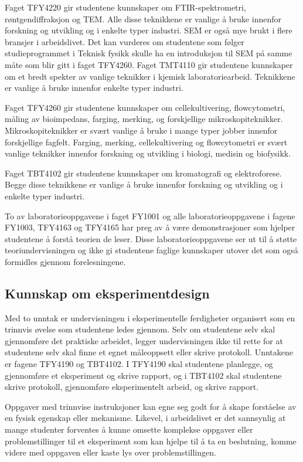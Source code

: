 \documentclass{article}
\begin{document}
Faget TFY4220 gir studentene kunnskaper om FTIR-spektrometri, røntgendiffraksjon og TEM. Alle disse teknikkene er vanlige å bruke innenfor forskning og utvikling og i enkelte typer industri. SEM er også mye brukt i flere bransjer i arbeidslivet. Det kan vurderes om studentene som følger studieprogrammet i Teknisk fysikk skulle ha en introduksjon til SEM på samme måte som blir gitt i faget TFY4260.
Faget TMT4110 gir studentene kunnskaper om et bredt spekter av vanlige teknikker i kjemisk laboratoriearbeid. Teknikkene er vanlige å bruke innenfor enkelte typer industri.

Faget TFY4260 gir studentene kunnskaper om cellekultivering, flowcytometri, måling av bioimpedans, farging, merking, og forskjellige mikroskopiteknikker. Mikroskopiteknikker er svært vanlige å bruke i mange typer jobber innenfor forskjellige fagfelt. Farging, merking, cellekultivering og flowcytometri er svært vanlige teknikker innenfor forskning og utvikling i biologi, medisin og biofysikk.

Faget TBT4102 gir studentene kunnskaper om kromatografi og elektroforese. Begge disse teknikkene er vanlige å bruke innenfor forskning og utvikling og i enkelte typer industri.

To av laboratorieoppgavene i faget FY1001 og alle laboratorieoppgavene i fagene FY1003, TFY4163 og TFY4165 har preg av å være demonstrasjoner som hjelper studentene å forstå teorien de leser. Disse laboratorieoppgavene ser ut til å støtte teoriundervisningen og ikke gi studentene faglige kunnskaper utover det som også formidles gjennom forelesningene.

\subsection{Kunnskap om eksperimentdesign}
Med to unntak er undervisningen i eksperimentelle ferdigheter organisert som en trinnvis øvelse som studentene ledes gjennom. Selv om studentene selv skal gjennomføre det praktiske arbeidet, legger undervisningen ikke til rette for at studentene selv skal finne et egnet måleoppsett eller skrive protokoll. Unntakene er fagene TFY4190 og TBT4102. I TFY4190 skal studentene planlegge, og gjennomføre et eksperiment og skrive rapport, og i TBT4102 skal studentene skrive protokoll, gjennomføre eksperimentelt arbeid, og skrive rapport.

Oppgaver med trinnvise instruksjoner kan egne seg godt for å skape forståelse av en fysisk egenskap eller mekanisme. Likevel, i arbeidslivet er det sannsynlig at mange studenter forventes å kunne omsette komplekse oppgaver eller problemstillinger til et eksperiment som kan hjelpe til å ta en beslutning, komme videre med oppgaven eller kaste lys over problemstillingen.
\end{document}
